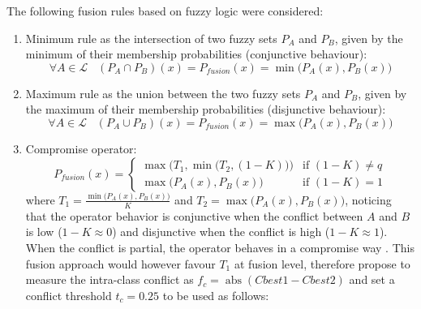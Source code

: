 \documentclass[10pt]{article}
\DeclareMathOperator{\abs}{abs}
\begin{document}
The following fusion rules based on fuzzy logic were considered:
\begin{enumerate}
    \item Minimum rule as the intersection of two fuzzy sets $P_A$ and $P_B$, given by the minimum of their membership probabilities (conjunctive behaviour):
    \begin{equation}
        \forall A\in\mathcal{L} \;\;\; (P_A\cap P_B)(x) = P_{fusion}(x) =\min\big(P_A(x),P_B(x)\big)
    \end{equation}
    \item Maximum rule as the union between the two fuzzy sets $P_A$ and $P_B$, given by the maximum of their membership probabilities (disjunctive behaviour):
    \begin{equation}
        \forall A\in\mathcal{L} \;\;\; (P_A\cup P_B)(x) = P_{fusion}(x)=\max\big(P_A(x),P_B(x)\big)
    \end{equation}
    \item Compromise operator:
    \begin{equation}\label{eq:compro}
        P_{fusion}(x)=
        \begin{cases}
            \max\Big(T_1,\min\big(T_2,(1-K)\big)\Big)& \text{if } (1-K)\neq q\\
            \max\Big(P_A(x),P_B(x)\Big) &\text{if }(1-K)= 1
        \end{cases}
    \end{equation}
    where $T_1=\frac{\min\big(P_A(x),P_B(x)\big)}{K}$ and $T_2=\max\big(P_A(x),P_B(x)\big)$, noticing that the operator behavior is conjunctive when the conflict between $A$ and $B$ is low ($1-K\approx 0$) and disjunctive when the conflict is high ($1-K\approx 1$). When the conflict is partial, the operator behaves in a compromise way \parencite{ouerghemmi_two-step_2017}. This fusion approach would however favour $T_1$ at fusion level, therefore \cite{ouerghemmi_two-step_2017} propose to measure the intra-class conflict as $f_c=\abs(Cbest1-Cbest2)$ and set a conflict threshold $t_c=0.25$ to be used as follows:
    

\end{enumerate}
\end{document}
